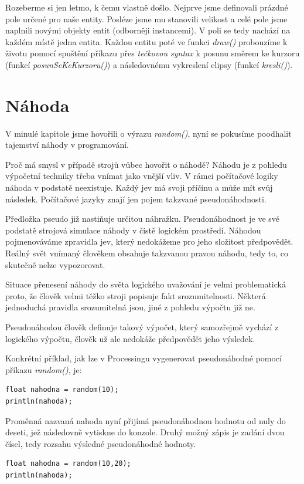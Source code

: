 \documentclass[10pt]{book}
\newcommand{\oddil}[1]{\section{#1}\index{#1}\label{#1}}
\newcommand{\vyraz}[1]{\textit{\gls{#1}}\index{#1}\label{#1}}
\begin{document}
Rozeberme si jen letmo, k čemu vlastně došlo. Nejprve jsme definovali prázdné pole určené pro naše entity. Posléze jsme mu stanovili velikost a celé pole jsme naplnili novými objekty entit  (odborněji instancemi). V poli se tedy nachází na každém místě jedna entita. Každou entitu poté ve funkci \vyraz{draw()} probouzíme k životu pomocí spuštění příkazu přes {\em tečkovou syntax} k posunu směrem ke kurzoru (funkcí {\em posunSeKeKurzoru()}) a následovnému vykreslení elipsy (funkcí {\em kresli()}).



\oddil{Náhoda}

V minulé kapitole jsme hovořili o výrazu \vyraz{random()}, nyní se pokusíme poodhalit tajemství náhody v programování.

Proč má smysl v případě strojů vůbec hovořit o náhodě? Náhodu je z pohledu výpočetní techniky třeba vnímat jako vnější vliv. V rámci počítačové logiky náhoda v podstatě neexistuje. Každý jev má svoji příčinu a může mít svůj následek. Počítačové jazyky znají jen pojem takzvané pseudonáhodnosti.

Předložka pseudo již nastiňuje určitou náhražku. Pseudonáhodnost je ve své podstatě strojová simulace náhody v čistě logickém prostředí. Náhodou pojmenováváme zpravidla jev, který nedokážeme pro jeho složitost předpovědět. Reálný svět vnímaný člověkem obsahuje takzvanou pravou náhodu, tedy to, co skutečně nelze vypozorovat.

Situace přenesení náhody do světa logického uvažování je velmi problematická proto, že člověk velmi těžko stroji popisuje fakt srozumitelnosti. Některá jednoduchá pravidla srozumitelná jsou, jiné z pohledu výpočtu již ne.

Pseudonáhodou člověk definuje takový výpočet, který samozřejmě vychází z logického výpočtu, člověk už ale nedokáže předpovědět jeho výsledek.

Konkrétní příklad, jak lze v Processingu vygenerovat pseudonáhodné pomocí příkazu \vyraz{random()}, je:

\begin{lstlisting}
float nahodna = random(10);
println(nahoda);
\end{lstlisting}

Proměnná nazvaná nahoda nyní přijímá pseudonáhodnou hodnotu od nuly do deseti, jež následovně vytiskne do konzole. Druhý možný zápis je zadání dvou čísel, tedy rozsahu výsledné pseudonáhodné hodnoty.


\begin{lstlisting}
float nahodna = random(10,20);
println(nahoda);
\end{lstlisting}
\end{document}
